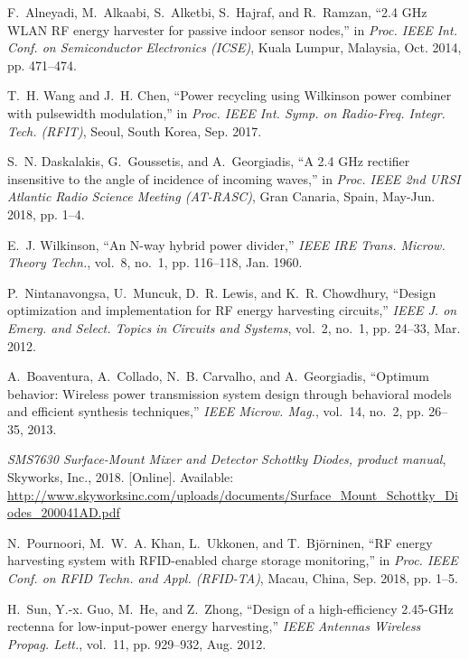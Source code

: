 \documentclass[journal]{IEEEtran}
\begin{document}
\begin{thebibliography}{10}
F.~Alneyadi, M.~Alkaabi, S.~Alketbi, S.~Hajraf, and R.~Ramzan, ``2.4 {GH}z
  {WLAN} {RF} energy harvester for passive indoor sensor nodes,'' in
  \emph{Proc. {IEEE} Int. Conf. on Semiconductor Electronics (ICSE)}, Kuala
  Lumpur, Malaysia, Oct. 2014, pp. 471--474.

T.~H. Wang and J.~H. Chen, ``Power recycling using {W}ilkinson power combiner
  with pulsewidth modulation,'' in \emph{Proc. {IEEE} Int. Symp. on Radio-Freq.
  Integr. Tech. (RFIT)}, Seoul, South Korea, Sep. 2017.

S.~N. Daskalakis, G.~Goussetis, and A.~Georgiadis, ``A 2.4 {GH}z rectifier
  insensitive to the angle of incidence of incoming waves,'' in \emph{Proc.
  {IEEE} 2nd URSI Atlantic Radio Science Meeting (AT-RASC)}, Gran Canaria,
  Spain, May-Jun. 2018, pp. 1--4.

E.~J. Wilkinson, ``An {N}-way hybrid power divider,'' \emph{{IEEE} IRE Trans.
  Microw. Theory Techn.}, vol.~8, no.~1, pp. 116--118, Jan. 1960.

P.~Nintanavongsa, U.~Muncuk, D.~R. Lewis, and K.~R. Chowdhury, ``Design
  optimization and implementation for {RF} energy harvesting circuits,''
  \emph{{IEEE} J. on Emerg. and Select. Topics in Circuits and Systems},
  vol.~2, no.~1, pp. 24--33, Mar. 2012.

A.~Boaventura, A.~Collado, N.~B. Carvalho, and A.~Georgiadis, ``Optimum
  behavior: Wireless power transmission system design through behavioral models
  and efficient synthesis techniques,'' \emph{{IEEE} Microw. Mag.}, vol.~14,
  no.~2, pp. 26--35, 2013.

\BIBentryALTinterwordspacing
\emph{SMS7630 Surface-Mount Mixer and Detector Schottky Diodes, product
  manual}, Skyworks, Inc., 2018. [Online]. Available:
  \url{http://www.skyworksinc.com/uploads/documents/Surface_Mount_Schottky_Diodes_200041AD.pdf}
\BIBentrySTDinterwordspacing

N.~Pournoori, M.~W.~A. Khan, L.~Ukkonen, and T.~Bj{\"o}rninen, ``{RF} energy
  harvesting system with {RFID}-enabled charge storage monitoring,'' in
  \emph{Proc. {IEEE} Conf. on RFID Techn. and Appl. (RFID-TA)}, Macau, China,
  Sep. 2018, pp. 1--5.

H.~Sun, Y.-x. Guo, M.~He, and Z.~Zhong, ``Design of a high-efficiency
  2.45-{GHz} rectenna for low-input-power energy harvesting,'' \emph{{IEEE}
  Antennas Wireless Propag. Lett.}, vol.~11, pp. 929--932, Aug. 2012.


\end{thebibliography}
\end{document}
